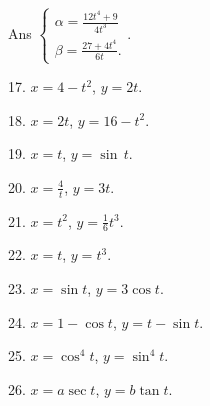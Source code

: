 Ans $\begin{cases} \alpha = \frac{12t^4 + 9}{4t^3} \\ 
\beta = \frac{27 + 4t^4}{6t}. \end{cases}$.


17. $x = 4 -t^2$, $y = 2t$.
 	
18. $x = 2t$, $y = 16 -t^2$.
 	
19. $x = t$, $y = \sin\, t$.
 	
20. $x = \frac{4}{t}$, $y = 3t$. 	

21. $x = t^2$, $y = \frac{1}{6} t^3$. 	

22. $x = t$, $y = t^3$.

23. $x = \sin t$, $y = 3\cos t$.

24. $x = 1 -\cos t$, $y = t -\sin t$.

25. $x = \cos^4t$, $y = \sin^4t$.

26. $x = a\sec t$, $y = b\tan t$.

